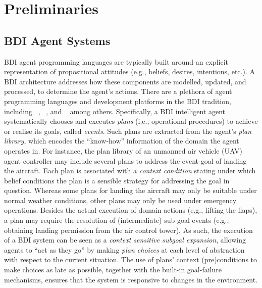 \section{Preliminaries}\label{sec:preliminaries}

\subsection{BDI Agent Systems}


BDI agent programming languages are typically built around an explicit representation of propositional attitudes (e.g., beliefs, desires, intentions, etc.). A BDI architecture addresses how these components are modelled, updated, and processed, to determine the agent's actions.
There are a plethora of agent programming languages and development platforms in the BDI tradition, including
\JACK~\cite{BusettaRHL:AL99-JACK},  
\JADEX~\cite{Pokahr:EXP03-JADEX}, and
\JASON~\cite{jasonbook}
among others. 
Specifically, a BDI intelligent agent systematically chooses and executes \emph{plans} (i.e., operational procedures) to achieve or realise its goals, called \emph{events}.
Such plans are extracted from the agent's \emph{plan library}, which encodes the ``know-how'' information of the domain the agent operates in.
For instance, the plan library of an unmanned air vehicle (UAV) agent controller may include several plans to address the event-goal of landing the aircraft. Each plan is associated with a \emph{context condition} stating under which belief conditions the plan is a sensible strategy for addressing the goal in question. Whereas some plans for landing the aircraft may only be suitable under normal weather conditions, other plans may only be used under emergency operations.
Besides the actual execution of domain actions (e.g., lifting the flaps), a plan may require the resolution of (intermediate) sub-goal events (e.g., obtaining landing permission from the air control tower). As such, the execution of a BDI system can be seen as a \textit{context sensitive subgoal expansion}, allowing agents to ``act as they go'' by making \emph{plan choices} at each level of abstraction with respect to the current situation. The use of plans' context (pre)conditions to make choices as late as possible, together with the built-in goal-failure mechanisms, ensures that the system is responsive to changes in the environment. 

